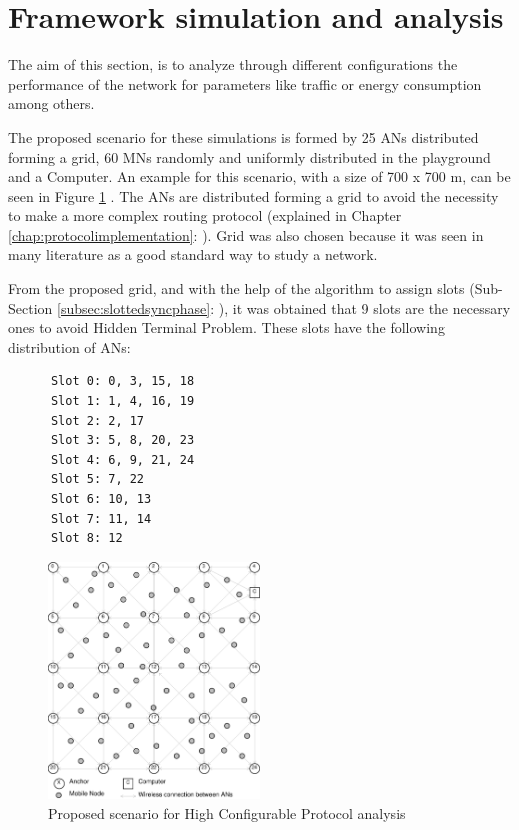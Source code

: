 \section{Framework simulation and analysis}

The aim of this section, is to analyze through different configurations the performance of the network for parameters like traffic or energy 
consumption among others.

The proposed scenario for these simulations is formed by 25 \acp{AN} distributed forming a grid, 60 \acp{MN} randomly and uniformly distributed in the
playground and a Computer. An example for this scenario, with a size of 700 x 700 m, can be seen in Figure \ref{fig:finalscenario} . The \acp{AN} 
are distributed forming a grid to avoid the necessity to make a more complex routing protocol (explained in Chapter \ref{chap:protocolimplementation}: 
). Grid was also chosen because it was seen in many literature as a good standard way to study a network.

From the proposed grid, and with the help of the algorithm to assign slots (Sub-Section \ref{subsec:slottedsyncphase}: 
), it was obtained that 9 slots are the necessary ones to avoid Hidden Terminal Problem. These slots have the 
following distribution of \acp{AN}:

\begin{verbatim}
      Slot 0: 0, 3, 15, 18
      Slot 1: 1, 4, 16, 19
      Slot 2: 2, 17
      Slot 3: 5, 8, 20, 23
      Slot 4: 6, 9, 21, 24
      Slot 5: 7, 22
      Slot 6: 10, 13
      Slot 7: 11, 14
      Slot 8: 12
\end{verbatim}

\begin{figure}[ht]
 \begin{center}
  \includegraphics[width=0.5\textwidth]{finalscenario.eps}
 \end{center}
 \caption{Proposed scenario for High Configurable Protocol analysis}
 \label{fig:finalscenario}
\end{figure}

